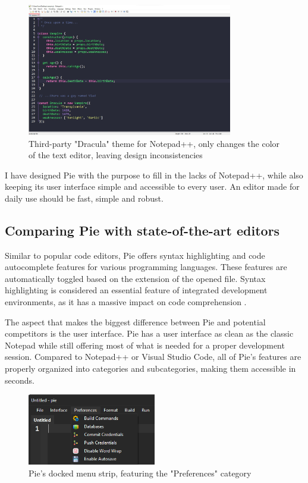 \begin{figure}[H]
\centering
\includegraphics[width=0.8\textwidth]{images/notepad-plus-plus-dark.jpg}
\caption{Third-party "Dracula" theme for Notepad++, only changes the color of the text editor, leaving design inconsistencies}
\label{fig:fig2,1.}
\end{figure}

I have designed Pie with the purpose to fill in the lacks of Notepad++, while also keeping its user interface simple and accessible to every user. An editor made for daily use should be fast, simple and robust.

\subsection{Comparing Pie with state-of-the-art editors}

Similar to popular code editors, Pie offers syntax highlighting and code autocomplete features for various programming languages. These features are automatically toggled based on the extension of the opened file. Syntax highlighting is considered an essential feature of integrated development environments, as it has a massive impact on code comprehension \cite{syntax}.

The aspect that makes the biggest difference between Pie and potential competitors is the user interface. Pie has a user interface as clean as the classic Notepad while still offering most of what is needed for a proper development session. Compared to Notepad++ or Visual Studio Code, all of Pie's features are properly organized into categories and subcategories, making them accessible in seconds.

\begin{figure}[h]
\centering
\includegraphics[width=0.5\textwidth]{images/pie-menu-strip.png}
\caption{Pie's docked menu strip, featuring the "Preferences" category}
\label{fig:fig2,1.}
\end{figure}

